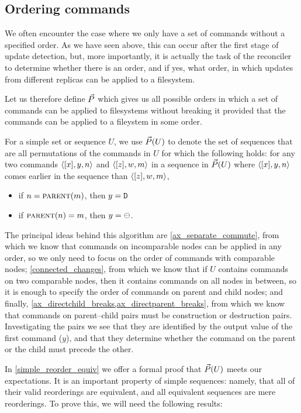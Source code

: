 
\subsection{Ordering commands}\label{ordering}

We often encounter the case where we only have a set of commands without a specified order.
As we have seen above, this can occur after the first stage of update detection,
but, more importantly,
it is actually the task of the reconciler to determine whether there is an order,
and if yes, what order,
in which updates from different replicas can be applied to a filesystem.

Let us therefore define $\ordersetsign$ which gives us all
possible orders in which a set of commands can be applied
to filesystems without breaking it
provided that the commands can be applied to a fileystem in some order.

\begin{mydef}[$\ordersetsign$]\label{def_orderset}
For a simple set or sequence $U$,
we use $\vec{P}({U})$ to denote the set of sequences
that are all permutations of the commands in $U$
for which the following holds:
for any two commands $\langle{[x],y,n}\rangle$ and $\langle{[z],w,m}\rangle$ in a sequence in $\vec{P}({U})$
where $\langle{[x],y,n}\rangle$ comes earlier in the sequence than $\langle{[z],w,m}\rangle$,
\begin{itemize}
\item if $n=\text{\normalfont\scshape{parent}}(m)$, then $y=\mathtt{D}$
\item if $\text{\normalfont\scshape{parent}}(n)=m$, then $y=\ominus$.
\end{itemize}
\end{mydef}

The principal ideas behind this algorithm are 
\cref{ax_separate_commute}, from which we know that commands on incomparable
nodes can be applied in any order, so we only need to focus on the order of commands
with comparable nodes;
\cref{connected_changes}, from which we know that if $U$ contains commands on two comparable
nodes, then it contains commands on all nodes in between, so it is enough to specify
the order of commands on parent and child nodes;
and finally, \cref{ax_directchild_breaks,ax_directparent_breaks}, from which we know
that commands on parent--child pairs must be construction or destruction pairs.
Investigating the pairs we see that they are identified by the output value of the first command ($y$),
and that they determine whether the command on the parent or the child must precede the other.

In \cref{simple_reorder_equiv} we offer a formal proof that $\vec{P}({U})$ meets our expectations.
It is an important property of simple sequences: namely, that
all of their valid reorderings are equivalent,
and all equivalent sequences are mere reorderings.
To prove this, we will need the following results:



